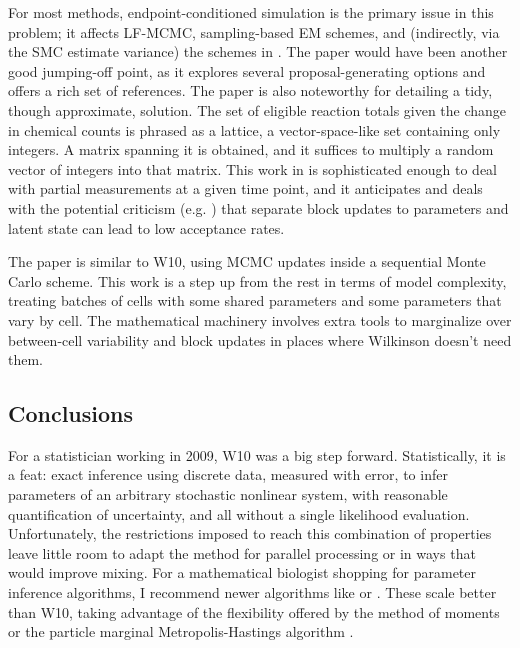 \documentclass{article}
\begin{document}
For most methods, endpoint-conditioned simulation is the primary issue in this problem; it affects LF-MCMC, sampling-based EM schemes, and (indirectly, via the SMC estimate variance) the schemes in \cite{golightly2011bayesian,owen2014scalable}. The paper \cite{golightly2014smc_b_subtilis} would have been another good jumping-off point, as it explores several proposal-generating options and offers a rich set of references. The paper \cite{amrein2012rate} is also noteworthy for detailing a tidy, though approximate, solution. The set of eligible reaction totals given the change in chemical counts is phrased as a lattice, a vector-space-like set containing only integers. A matrix spanning it is obtained, and it suffices to multiply a random vector of integers into that matrix. This work in \cite{amrein2012rate} is sophisticated enough to deal with partial measurements at a given time point, and it anticipates and deals with the potential criticism (e.g. \cite{golightly2011bayesian}) that separate block updates to parameters and latent state can lead to low acceptance rates.

The paper \cite{zechner2014scalable} is similar to W10, using MCMC updates inside a sequential Monte Carlo scheme. This work is a step up from the rest in terms of model complexity, treating batches of cells with some shared parameters and some parameters that vary by cell. The mathematical machinery involves extra tools to marginalize over between-cell variability and block updates in places where Wilkinson doesn't need them. 

\subsection{Conclusions}
For a statistician working in 2009, W10 was a big step forward. Statistically, it is a feat: exact inference using discrete data, measured with error, to infer parameters of an arbitrary stochastic nonlinear system, with reasonable quantification of uncertainty, and all without a single likelihood evaluation. Unfortunately, the restrictions imposed to reach this combination of properties leave little room to adapt the method for parallel processing or in ways that would improve mixing. For a mathematical biologist shopping for parameter inference algorithms, I recommend newer algorithms like \cite{owen2014scalable}%
 or \cite{zechner2014scalable}. These scale better than W10, taking advantage of the flexibility offered by the method of moments or the particle marginal Metropolis-Hastings algorithm \cite{andrieu2010particle}.
\end{document}

